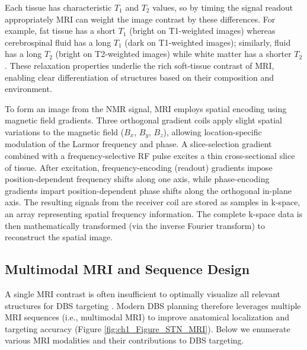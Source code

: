 Each tissue has characteristic $T_1$ and $T_2$ values, so by timing the signal readout appropriately MRI can weight the image contrast by these differences. For example, fat tissue has a short $T_1$ (bright on T1-weighted images) whereas cerebrospinal fluid has a long $T_1$ (dark on T1-weighted images); similarly, fluid has a long $T_2$ (bright on T2-weighted images) while white matter has a shorter $T_2$. These relaxation properties underlie the rich soft-tissue contrast of MRI, enabling clear differentiation of structures based on their composition and environment. 

To form an image from the NMR signal, MRI employs spatial encoding using magnetic field gradients. Three orthogonal gradient coils apply slight spatial variations to the magnetic field ($B_x$, $B_y$, $B_z$), allowing location-specific modulation of the Larmor frequency and phase. A slice-selection gradient combined with a frequency-selective RF pulse excites a thin cross-sectional slice of tissue. After excitation, frequency-encoding (readout) gradients impose position-dependent frequency shifts along one axis, while phase-encoding gradients impart position-dependent phase shifts along the orthogonal in-plane axis. The resulting signals from the receiver coil are stored as samples in k-space, an array representing spatial frequency information. The complete k-space data is then mathematically transformed (via the inverse Fourier transform) to reconstruct the spatial image.

\subsection{Multimodal MRI and Sequence Design}
A single MRI contrast is often insufficient to optimally visualize all relevant structures for DBS targeting \cite{Boutet2021-vg,Treu2020-ih}. Modern DBS planning therefore leverages multiple MRI sequences (i.e., multimodal MRI) to improve anatomical localization and targeting accuracy (Figure \ref{fig:ch1_Figure_STN_MRI}). Below we enumerate various MRI modalities and their contributions to DBS targeting.

